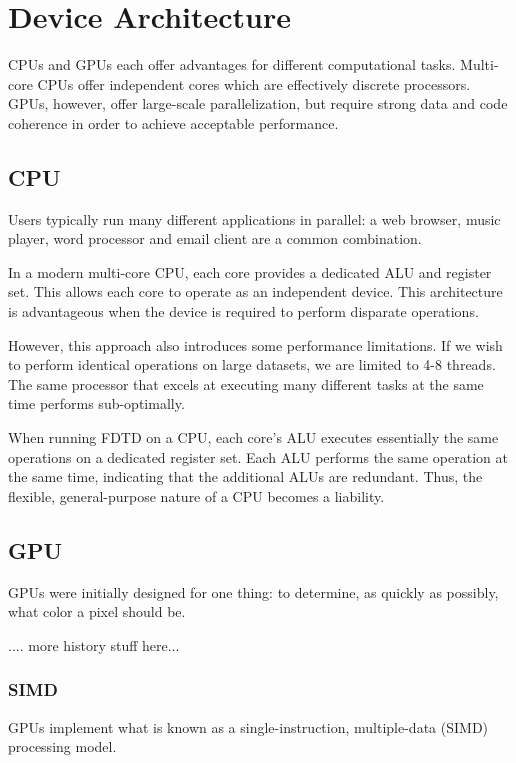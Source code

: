\chapter{Device Architecture} \label{ch:device architecture}

CPUs and GPUs each offer advantages for different computational tasks. Multi-core CPUs offer independent cores which are effectively discrete processors. GPUs, however, offer large-scale parallelization, but require strong data and code coherence in order to achieve acceptable performance.


\section{CPU}

Users typically run many different applications in parallel: a web browser, music player, word processor and email client are a common combination.

In a modern multi-core CPU, each core provides a dedicated ALU and register set. This allows each core to operate as an independent device. This architecture is advantageous when the device is required to perform disparate operations.

However, this approach also introduces some performance limitations. If we wish to perform identical operations on large datasets, we are limited to 4-8 threads. The same processor that excels at executing many different tasks at the same time performs sub-optimally. 

When running FDTD on a CPU, each core's ALU executes essentially the same operations on a dedicated register set. Each ALU performs the same operation at the same time, indicating that the additional ALUs are redundant. Thus, the flexible, general-purpose nature of a CPU becomes a liability.

\section{GPU}

GPUs were initially designed for one thing: to determine, as quickly as possibly, what color a pixel should be. 

.... more history stuff here...


\subsection{SIMD}

GPUs implement what is known as a single-instruction, multiple-data (SIMD)\cite{techpattichis2003} processing model.

